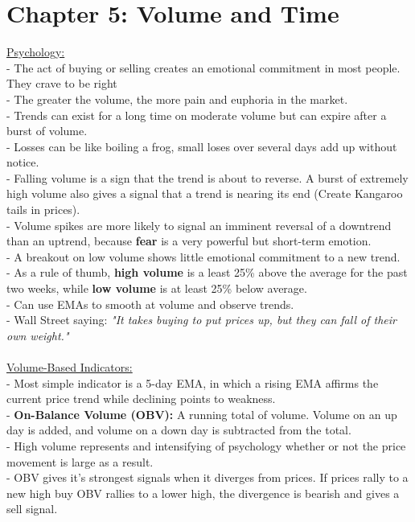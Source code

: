 \documentclass[12pt,fullpage]{article}
\begin{document}
\section*{Chapter 5: Volume and Time}
\underline{Psychology:}\\
- The act of buying or selling creates an emotional commitment in most people. They crave to be right\\
- The greater the volume, the more pain and euphoria in the market.\\
- Trends can exist for a long time on moderate volume but can expire after a burst of volume.\\
- Losses can be like boiling a frog, small loses over several days add up without notice.\\
- Falling volume is a sign that the trend is about to reverse. A burst of extremely high volume also gives a signal that a trend is nearing its end (Create Kangaroo tails in prices).\\
- Volume spikes are more likely to signal an imminent reversal of a downtrend than an uptrend, because \textbf{fear} is a very powerful but short-term emotion.\\
- A breakout on low volume shows little emotional commitment to a new trend.\\
- As a rule of thumb, \textbf{high volume} is a least 25\% above the average for the past two weeks, while \textbf{low volume} is at least 25\% below average.\\
- Can use EMAs to smooth at volume and observe trends.\\
- Wall Street saying: \emph{"It takes buying to put prices up, but they can fall of their own weight."}\\
\\
\underline{Volume-Based Indicators:}\\
- Most simple indicator is a 5-day EMA, in which a rising EMA affirms the current price trend while declining points to weakness.\\
- \textbf{On-Balance Volume (OBV):} A running total of volume. Volume on an up day is added, and volume on a down day is subtracted from the total.\\
- High volume represents and intensifying of psychology whether or not the price movement is large as a result.\\
- OBV gives it's strongest signals when it diverges from prices. If prices rally to a new high buy OBV rallies to a lower high, the divergence is bearish and gives a sell signal.\\
\end{document}
